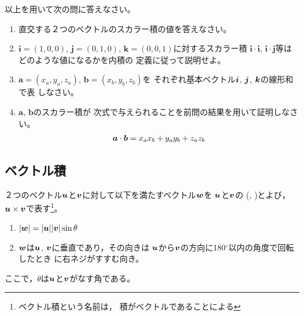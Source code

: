 \documentclass[twocolumn,11pt]{jarticle}
\begin{document}
\nquestion
以上を用いて次の問に答えなさい。
\begin{enumerate}
\item 直交する２つのベクトルのスカラー積の値を答えなさい。
\item $\boldsymbol{i}=(1,0,0)$, $\boldsymbol{j}=(0,1,0)$,
  $\boldsymbol{k}=(0,0,1)$に対するスカラー積
  $\boldsymbol{i}\cdot\boldsymbol{i}$, 
  $\boldsymbol{i}\cdot\boldsymbol{j}$等はどのような値になるかを内積の
  定義に従って説明せよ。
\item $\boldsymbol{a}=(x_a,y_a,z_a)$, $\boldsymbol{b}=(x_b,y_b,z_b)$を
  それぞれ基本ベクトル$\boldsymbol{i}$,  $\boldsymbol{j}$, $\boldsymbol{k}$の線形和で表
  しなさい。
\item 
  $\boldsymbol{a}$, $\boldsymbol{b}$のスカラー積が
  次式で与えられることを前問の結果を用いて証明しなさい。  
  \begin{align}
    \boldsymbol{a}\cdot\boldsymbol{b}=x_ax_b + y_ay_b + z_az_b\notag
  \end{align}
\end{enumerate}

\subsection{ベクトル積}

２つのベクトル$\boldsymbol{u}$と$\boldsymbol{v}$に対して以下を満たすベクトル$\boldsymbol{w}$を
$\boldsymbol{u}$と$\boldsymbol{v}$の
(, )とよび，
$\boldsymbol{u}\times\boldsymbol{v}$で表す\footnote{ベクトル積という名前は，
  積がベクトルであることによる}。
\begin{enumerate}
\item $|\boldsymbol{w}|=|\boldsymbol{u}||\boldsymbol{v}|\sin\theta$
\item $\boldsymbol{w}$は$\boldsymbol{u}$, $\boldsymbol{v}$に垂直であり，その向きは
  $\boldsymbol{u}$から$\boldsymbol{v}$の方向に180$^\circ$以内の角度で回転したとき
  に右ネジがすすむ向き。
\end{enumerate}
ここで，$\theta$は$\boldsymbol{u}$と$\boldsymbol{v}$がなす角である。
\end{document}
